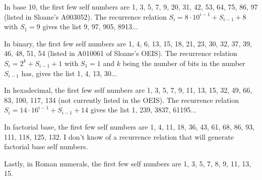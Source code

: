 \documentclass[12pt]{article}
\begin{document}
In base 10, the first few  self numbers are 1, 3, 5, 7, 9, 20, 31, 42, 53, 64, 75, 86, 97 (listed in Sloane's A003052). The recurrence relation $S_i = 8 \cdot 10^{i - 1} + S_{i - 1} + 8$ with $S_1 = 9$ gives the list 9, 97, 905, 8913...

In binary, the first few self numbers are 1, 4, 6, 13, 15, 18, 21, 23, 30, 32, 37, 39, 46, 48, 51, 54 (listed in A010061 of Sloane's OEIS). The recurrence relation $S_i = 2^k + S_{i - 1} + 1$ with $S_1 = 1$ and $k$ being the number of bits in the number $S_{i - 1}$ has, gives the list 1, 4, 13, 30...

In hexadecimal, the first few self numbers are 1, 3, 5, 7, 9, 11, 13, 15, 32, 49, 66, 83, 100, 117, 134 (not currently listed in the OEIS). The recurrence relation $S_i = 14 \cdot 16^{i - 1} + S_{i - 1} + 14$ gives the list 1, 239, 3837, 61195...

In factorial base, the first few self numbers are 1, 4, 11, 18, 36, 43, 61, 68, 86, 93, 111, 118, 125, 132. I don't know of a recurrence relation that will generate factorial base self numbers.

Lastly, in Roman numerals, the first few self numbers are 1, 3, 5, 7, 8, 9, 11, 13, 15.
\end{document}

